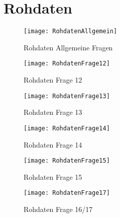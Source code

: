 \chapter{Rohdaten}

\begin{sidewaysfigure}[!htbp]
\begin{center}
  \texttt{[image: RohdatenAllgemein]} %
  \caption{Rohdaten Allgemeine Fragen}
  \label{fig:BPM_2}
\end{center}
\end{sidewaysfigure}

\begin{sidewaysfigure}[!htbp]
\begin{center}
  \texttt{[image: RohdatenFrage12]} %
  \caption{Rohdaten Frage 12}
  \label{fig:BPM_2}
\end{center}
\end{sidewaysfigure}

\begin{sidewaysfigure}[!htbp]
\begin{center}
  \texttt{[image: RohdatenFrage13]} %
  \caption{Rohdaten Frage 13}
  \label{fig:BPM_2}
\end{center}
\end{sidewaysfigure}

\begin{sidewaysfigure}[!htbp]
\begin{center}
  \texttt{[image: RohdatenFrage14]} %
  \caption{Rohdaten Frage 14}
  \label{fig:BPM_2}
\end{center}
\end{sidewaysfigure}

\begin{sidewaysfigure}[!htbp]
\begin{center}
  \texttt{[image: RohdatenFrage15]} %
  \caption{Rohdaten Frage 15}
  \label{fig:BPM_2}
\end{center}
\end{sidewaysfigure}

\begin{sidewaysfigure}[!htbp]
\begin{center}
  \texttt{[image: RohdatenFrage17]} %
  \caption{Rohdaten Frage 16/17}
  \label{fig:BPM_2}
\end{center}
\end{sidewaysfigure}

